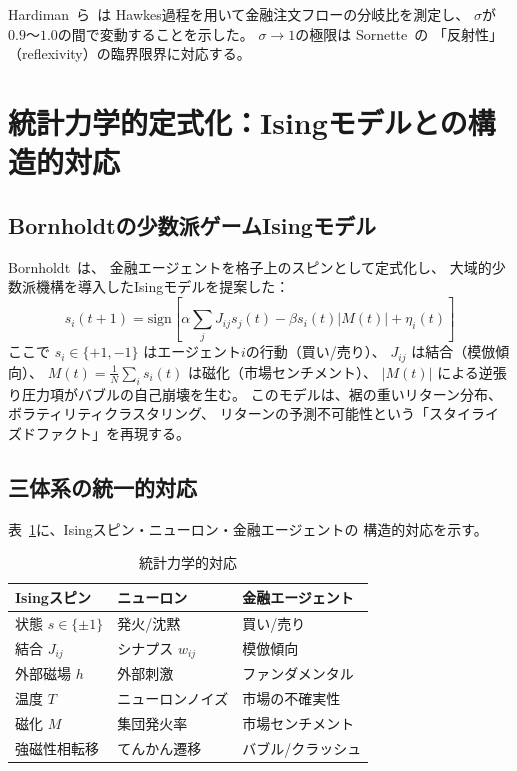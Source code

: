 \documentclass[12pt,twocolumn]{ltjsarticle}
\begin{document}
Hardiman~ら~\cite{Hardiman2013}は
Hawkes過程を用いて金融注文フローの分岐比を測定し、
$\sigma$が$0.9$〜$1.0$の間で変動することを示した。
$\sigma \to 1$の極限は
Sornette~\cite{Sornette2003}の
「反射性」（reflexivity）の臨界限界に対応する。


\section{統計力学的定式化：Isingモデルとの構造的対応}
\label{sec:ising}

\subsection{Bornholdtの少数派ゲームIsingモデル}

Bornholdt~\cite{Bornholdt2001}は、
金融エージェントを格子上のスピンとして定式化し、
大域的少数派機構を導入したIsingモデルを提案した：
\begin{equation}
s_i(t+1) = \text{sign}\!\left[
\alpha \sum_j J_{ij} s_j(t) - \beta s_i(t) |M(t)| + \eta_i(t)
\right]
\end{equation}
ここで $s_i \in \{+1, -1\}$ はエージェント$i$の行動（買い/売り）、
$J_{ij}$ は結合（模倣傾向）、
$M(t) = \frac{1}{N}\sum_i s_i(t)$ は磁化（市場センチメント）、
$|M(t)|$ による逆張り圧力項がバブルの自己崩壊を生む。
このモデルは、裾の重いリターン分布、ボラティリティクラスタリング、
リターンの予測不可能性という「スタイライズドファクト」を再現する。

\subsection{三体系の統一的対応}

表~\ref{tab:ising}に、Isingスピン・ニューロン・金融エージェントの
構造的対応を示す。

\begin{table}[h]
\centering
\caption{統計力学的対応}
\label{tab:ising}
\begin{tabular}{lll}
\toprule
\textbf{Isingスピン} & \textbf{ニューロン} & \textbf{金融エージェント} \\
\midrule
状態 $s \in \{\pm1\}$ & 発火/沈黙 & 買い/売り \\
結合 $J_{ij}$ & シナプス $w_{ij}$ & 模倣傾向 \\
外部磁場 $h$ & 外部刺激 & ファンダメンタル \\
温度 $T$ & ニューロンノイズ & 市場の不確実性 \\
磁化 $M$ & 集団発火率 & 市場センチメント \\
強磁性相転移 & てんかん遷移 & バブル/クラッシュ \\
\bottomrule
\end{tabular}
\end{table}
\end{document}
